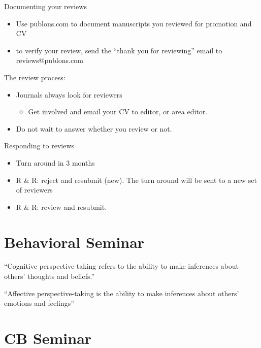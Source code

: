 \documentclass[
]{book}
\providecommand{\tightlist}{%
  \setlength{\itemsep}{0pt}\setlength{\parskip}{0pt}}
\begin{document}
Documenting your reviews

\begin{itemize}
\item
  Use publons.com to document manuscripts you reviewed for promotion and CV
\item
  to verify your review, send the ``thank you for reviewing'' email to reviews@publons.com
\end{itemize}

The review process:

\begin{itemize}
\item
  Journals always look for reviewers

  \begin{itemize}
  \tightlist
  \item
    Get involved and email your CV to editor, or area editor.
  \end{itemize}
\end{itemize}

\begin{itemize}
\tightlist
\item
  Do not wait to answer whether you review or not.
\end{itemize}

Responding to reviews

\begin{itemize}
\item
  Turn around in 3 months
\item
  R \& R: reject and resubmit (new). The turn around will be sent to a new set of reviewers
\end{itemize}

\begin{itemize}
\tightlist
\item
  R \& R: review and resubmit.
\end{itemize}

\hypertarget{behavioral-seminar}{%
\chapter{Behavioral Seminar}\label{behavioral-seminar}}

``Cognitive perspective-taking refers to the ability to make inferences about others' thoughts and beliefs.''

``Affective perspective-taking is the ability to make inferences about others' emotions and feelings'' \citep{healey2018}

\hypertarget{cb-seminar}{%
\chapter{CB Seminar}\label{cb-seminar}}
\end{document}
